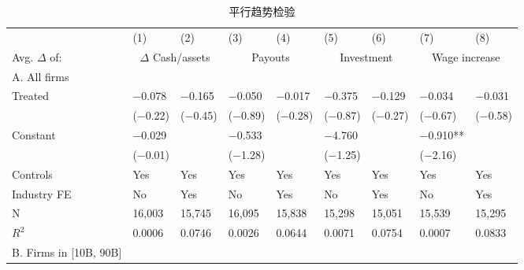 \documentclass{article}
\begin{document}
\begin{table}[H]
\caption{平行趋势检验}
\centering
\begin{tabularx}{\textwidth}{lXXXXXXXX}
\toprule
                             & (1)             & (2)            & (3)           & (4)         & (5)            & (6)           & (7)              & (8)            \\ \cmidrule(lr){2-3} \cmidrule(lr){4-5} \cmidrule(lr){6-7} \cmidrule(lr){8-9}
Avg. $\Delta$ of:                   & \multicolumn{2}{c}{$\Delta$ Cash/assets} & \multicolumn{2}{c}{Payouts} & \multicolumn{2}{c}{Investment} & \multicolumn{2}{c}{Wage increase} \\ \midrule
A. All firms                 &                 &                &               &             &                &               &                  &                \\ \midrule
Treated                      & −0.078          & −0.165         & −0.050        & −0.017      & −0.375         & −0.129        & −0.034           & −0.031         \\
                             & (−0.22)         & (−0.45)        & (−0.89)       & (−0.28)     & (−0.87)        & (−0.27)       & (−0.67)          & (−0.58)        \\
Constant                     & −0.029          &                & −0.533        &             & −4.760         &               & −0.910**         &                \\
                             & (−0.01)         &                & (−1.28)       &             & (−1.25)        &               & (−2.16)          &                \\
Controls                     & Yes             & Yes            & Yes           & Yes         & Yes            & Yes           & Yes              & Yes            \\
Industry FE                  & No              & Yes            & No            & Yes         & No             & Yes           & No               & Yes            \\
N                            & 16,003          & 15,745         & 16,095        & 15,838      & 15,298         & 15,051        & 15,539           & 15,295         \\
$R^2$                           & 0.0006          & 0.0746         & 0.0026        & 0.0644      & 0.0071         & 0.0754        & 0.0007           & 0.0833         \\ \midrule
B. Firms in   {[}10B, 90B{]} &                 &                &               &             &                &               &                  &                \\ \midrule

\end{tabularx}
\end{table}
\end{document}
